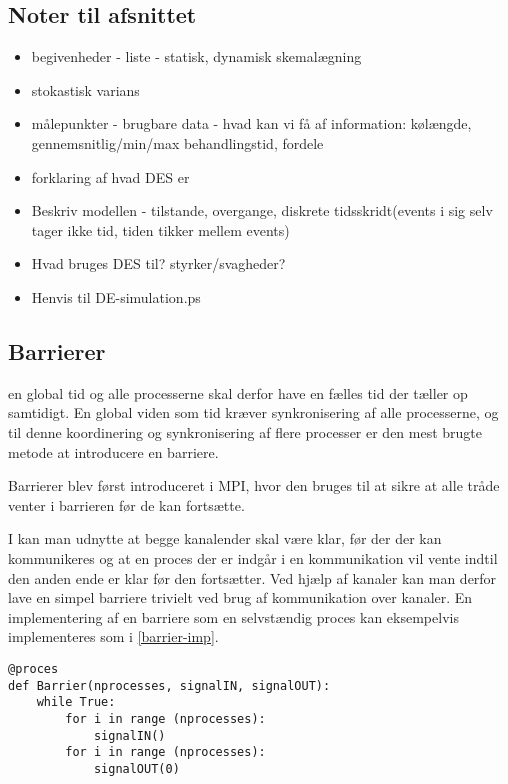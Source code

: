 \subsection*{Noter til afsnittet}
\begin{itemize}
\tightlist
	\item begivenheder - liste - statisk, dynamisk skemalægning 
	\item stokastisk varians
	\item målepunkter - brugbare data - hvad kan vi få af information: kølængde, gennemsnitlig/min/max behandlingstid, fordele
	\item forklaring af hvad DES er
	\item Beskriv modellen - tilstande, overgange, diskrete tidsskridt(events i sig selv tager ikke tid, tiden tikker mellem events)
	\item Hvad bruges DES til? styrker/svagheder?
	\item Henvis til DE-simulation.ps
\end{itemize}

\subsection{Barrierer} \label{sec:barrierer}
  en 
global tid og alle processerne skal derfor have en fælles tid der tæller op 
samtidigt.  En global viden som tid kræver synkronisering af alle 
processerne, og til denne koordinering og synkronisering af flere 
processer er den mest brugte metode at introducere en barriere.

Barrierer blev først introduceret i MPI, hvor den bruges til at 
sikre at alle tråde venter i barrieren før de kan fortsætte. 

I \csp kan man udnytte at begge 
kanalender skal være klar, før der der kan kommunikeres og at en proces der er 
indgår i en kommunikation vil vente indtil den anden ende er klar før den 
fortsætter.  Ved hjælp af kanaler kan man derfor lave en simpel barriere 
trivielt ved brug af kommunikation over kanaler.  En implementering af en 
barriere som en selvstændig proces kan eksempelvis implementeres som i 
\cref{barrier-imp}.

\begin{lstlisting}[float, label=barrier-imp,caption=En barriere i \pycsp]
@proces
def Barrier(nprocesses, signalIN, signalOUT):
	while True:
		for i in range (nprocesses):
			signalIN()
		for i in range (nprocesses):
			signalOUT(0)
\end{lstlisting}


